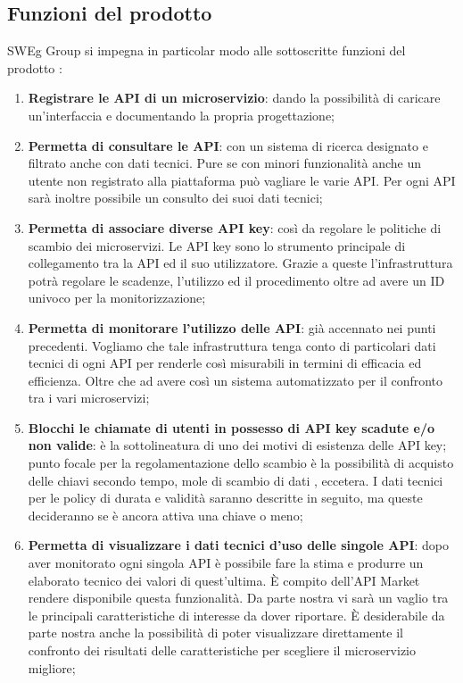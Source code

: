 \documentclass[12pt,a4paper,titlepage]{article}
\begin{document}
	\subsection{Funzioni del prodotto}
	SWEg Group si impegna in particolar modo alle sottoscritte funzioni del prodotto :
	\begin{enumerate}
		\item \textbf{Registrare le API di un microservizio}: dando la possibilità di caricare un'interfaccia e documentando la propria progettazione;
		\item \textbf{Permetta di consultare le API}: con un sistema di ricerca designato e filtrato anche con dati tecnici. Pure se con minori funzionalità anche un utente non registrato alla piattaforma può vagliare le varie API. Per ogni API sarà inoltre possibile un consulto dei suoi dati tecnici;
		\item \textbf{Permetta di associare diverse API key}: così da regolare le politiche di scambio dei microservizi. Le API key sono lo strumento principale di collegamento tra la API ed il suo utilizzatore. Grazie a queste l'infrastruttura potrà regolare le scadenze, l'utilizzo ed il procedimento oltre ad avere un ID univoco per la monitorizzazione;
		\item \textbf{Permetta di monitorare l'utilizzo delle API}:	già accennato nei punti precedenti. Vogliamo che tale infrastruttura tenga conto di particolari dati tecnici di ogni API per renderle così misurabili in termini di efficacia ed efficienza. Oltre che ad avere così un sistema automatizzato per il confronto tra i vari microservizi;
		\item \textbf{Blocchi le chiamate di utenti in possesso di API key scadute e/o non valide}:	è la sottolineatura di uno dei motivi di esistenza delle API key; punto focale per la regolamentazione dello scambio è la possibilità di acquisto delle chiavi secondo tempo, mole di scambio di dati , eccetera. I dati tecnici per le policy di durata e validità saranno descritte in seguito, ma queste decideranno se è ancora attiva una chiave o meno;
		\item \textbf{Permetta di visualizzare i dati tecnici d'uso delle singole API}:	dopo aver monitorato ogni singola API è possibile fare la stima e produrre un elaborato tecnico dei valori di quest'ultima. È compito dell'API Market rendere disponibile questa funzionalità. Da parte nostra vi sarà un vaglio tra le principali caratteristiche di interesse da dover riportare. È desiderabile da parte nostra anche la possibilità di poter visualizzare direttamente il confronto dei risultati delle caratteristiche per scegliere il microservizio migliore;

\end{enumerate}
\end{document}
